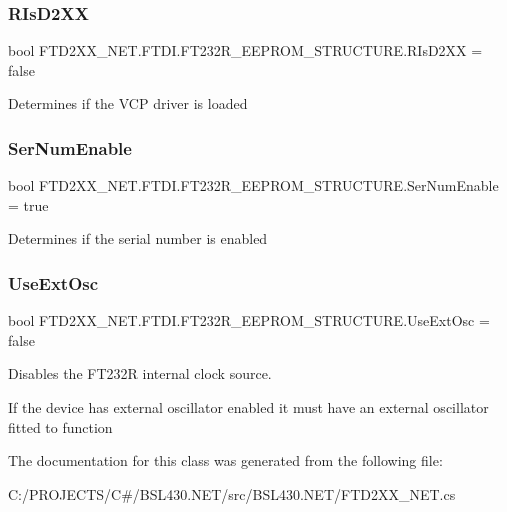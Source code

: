 \subsubsection{\texorpdfstring{RIsD2XX}{RIsD2XX}}
{\footnotesize\ttfamily bool F\+T\+D2\+X\+X\+\_\+\+N\+E\+T.\+F\+T\+D\+I.\+F\+T232\+R\+\_\+\+E\+E\+P\+R\+O\+M\+\_\+\+S\+T\+R\+U\+C\+T\+U\+R\+E.\+R\+Is\+D2\+XX = false}



Determines if the V\+CP driver is loaded 

\mbox{\label{class_f_t_d2_x_x___n_e_t_1_1_f_t_d_i_1_1_f_t232_r___e_e_p_r_o_m___s_t_r_u_c_t_u_r_e_a2af24babbff3c27509d221150a6a00d8}} 
\subsubsection{\texorpdfstring{SerNumEnable}{SerNumEnable}}
{\footnotesize\ttfamily bool F\+T\+D2\+X\+X\+\_\+\+N\+E\+T.\+F\+T\+D\+I.\+F\+T232\+R\+\_\+\+E\+E\+P\+R\+O\+M\+\_\+\+S\+T\+R\+U\+C\+T\+U\+R\+E.\+Ser\+Num\+Enable = true}



Determines if the serial number is enabled 

\mbox{\label{class_f_t_d2_x_x___n_e_t_1_1_f_t_d_i_1_1_f_t232_r___e_e_p_r_o_m___s_t_r_u_c_t_u_r_e_a09e91bc353a7b99fdbe3ba6fc66e234b}} 
\subsubsection{\texorpdfstring{UseExtOsc}{UseExtOsc}}
{\footnotesize\ttfamily bool F\+T\+D2\+X\+X\+\_\+\+N\+E\+T.\+F\+T\+D\+I.\+F\+T232\+R\+\_\+\+E\+E\+P\+R\+O\+M\+\_\+\+S\+T\+R\+U\+C\+T\+U\+R\+E.\+Use\+Ext\+Osc = false}



Disables the F\+T232R internal clock source. 

If the device has external oscillator enabled it must have an external oscillator fitted to function 

The documentation for this class was generated from the following file\+:\begin{DoxyCompactItemize}
\item 
C\+:/\+P\+R\+O\+J\+E\+C\+T\+S/\+C\#/\+B\+S\+L430.\+N\+E\+T/src/\+B\+S\+L430.\+N\+E\+T/F\+T\+D2\+X\+X\+\_\+\+N\+E\+T.\+cs\end{DoxyCompactItemize}
